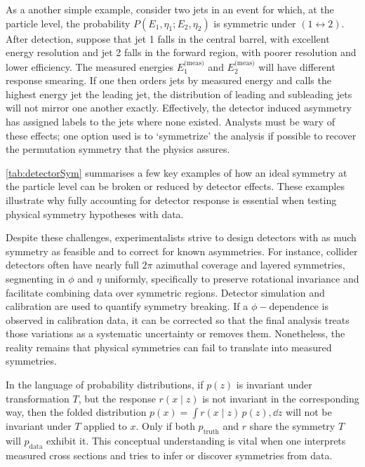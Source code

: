             As a another simple example, consider two jets in an event for which, at the particle level, the probability $P(E_1, \eta_1; E_2, \eta_2)$ is symmetric under $(1\leftrightarrow 2)$.
            After detection, suppose that jet 1 falls in the central barrel, with excellent energy resolution and jet 2 falls in the forward region, with poorer resolution and lower efficiency.
            The measured energies $E_1^\text{(meas)}$ and $E_2^\text{(meas)}$ will have different response smearing.
            If one then orders jets by measured energy and calls the highest energy jet the leading jet, the distribution of leading and subleading jets will not mirror one another exactly.
            Effectively, the detector induced asymmetry has assigned labels to the jets where none existed.
            Analysts must be wary of these effects;
            one option used is to `symmetrize' the analysis if possible to recover the permutation symmetry that the physics assures.

        \cref{tab:detectorSym} summarises a few key examples of how an ideal symmetry at the particle level can be broken or reduced by detector effects.
        These examples illustrate why fully accounting for detector response is essential when testing physical symmetry hypotheses with data.

        Despite these challenges, experimentalists strive to design detectors with as much symmetry as feasible and to correct for known asymmetries.
        For instance, collider detectors often have nearly full $2\pi$ azimuthal coverage and layered symmetries, segmenting in $\phi$ and $\eta$ uniformly, specifically to preserve rotational invariance and facilitate combining data over symmetric regions.
        Detector simulation and calibration are used to quantify symmetry breaking.
        If a $\phi-$dependence is observed in calibration data, it can be corrected so that the final analysis treats those variations as a systematic uncertainty or removes them.
        Nonetheless, the reality remains that physical symmetries can fail to translate into measured symmetries.

        In the language of probability distributions, if $p(z)$ is invariant under transformation $T$, but the response $r(x\mid z)$ is not invariant in the corresponding way, then the folded distribution $p(x) = \int r(x\mid z)\,p(z),\dd z$ will not be invariant under $T$ applied to $x$.
        Only if both $p_{\text{truth}}$ and $r$ share the symmetry $T$ will $p_{\text{data}}$ exhibit it.
        This conceptual understanding is vital when one interprets measured cross sections and tries to infer or discover symmetries from data.

